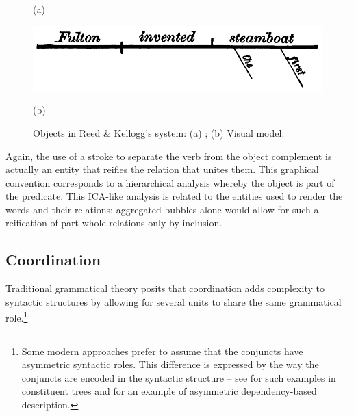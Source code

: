 \documentclass[english,output=paper,colorlinks,citecolor=brown]{../langscibook}
\begin{document}
 \begin{figure}
     (a) \hspace{1em} \begin{minipage}[c]{.45\textwidth}\includegraphics[width=\textwidth]{figures/04/ReedKellog2.png}\end{minipage}\hfill
     (b) \hspace{1em} 
     \caption{Objects in Reed \& Kellogg’s system: (a) \citeyear[53]{ReedBrainerd1879}; (b) Visual model.\label{fig:4:6}}
 \end{figure}


Again, the use of a stroke to separate the verb from the object complement is actually an entity that reifies the relation that unites them. This graphical convention corresponds to a hierarchical analysis whereby the object is part of the predicate. This ICA-like analysis is related to the entities used to render the words and their relations: aggregated bubbles alone would allow for such a reification of part-whole relations only by inclusion.

\subsection{Coordination}\label{sec:4:4.2}

Traditional grammatical theory posits that coordination adds complexity to syntactic structures by allowing for several units to share the same grammatical role.\footnote{\textrm{Some modern approaches prefer to assume that the conjuncts have asymmetric syntactic roles. This difference is expressed by the way the conjuncts are encoded in the syntactic structure – see \citet{Mouret2007} for such examples in constituent trees and \citet[50--51]{PolguereMeltschuk2009} for an example of asymmetric dependency-based description.}} 
\end{document}
